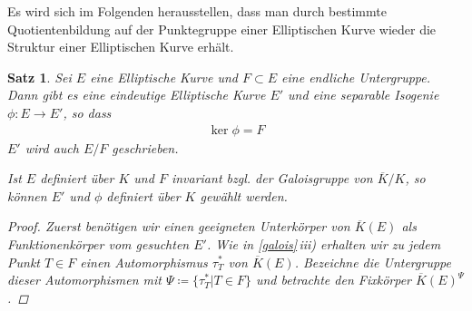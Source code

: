 \documentclass[english, german, parskip=half]{scrartcl}
\newtheorem{Satz}{Satz}[section]
\theoremstyle{definition}
\theoremstyle{remark}
\newcommand*{\K}{\ensuremath{K}} %
\newcommand*{\algK}{\ensuremath{\overline K}} %
\begin{document}
Es wird sich im Folgenden herausstellen, dass man durch bestimmte
Quotientenbildung auf der Punktegruppe einer Elliptischen Kurve wieder
die Struktur einer Elliptischen Kurve erhält.

\begin{Satz}
  Sei $E$ eine Elliptische Kurve und $F\subset E$ eine endliche
  Untergruppe.
  Dann gibt es eine eindeutige Elliptische Kurve $E'$ und eine
  separable Isogenie $\phi\colon E\to E'$, so dass
  \begin{gather*}
    \ker\phi = F
  \end{gather*}
  $E'$ wird auch $E/F$ geschrieben.

  Ist $E$ definiert über $K$ und $F$ invariant bzgl. der Galoisgruppe
  von $\algK/\K$, so können $E'$ und $\phi$ definiert über $K$ gewählt
  werden.
  \begin{proof}
    Zuerst benötigen wir einen geeigneten Unterkörper von $\algK(E)$
    als Funktionenkörper vom gesuchten $E'$.
    Wie in \autoref{galois}\,\emph{iii)} erhalten wir zu jedem Punkt
    $T\in F$ einen Automorphismus $\tau_T^*$ von $\algK(E)$.
    Bezeichne die Untergruppe dieser Automorphismen mit 
    $\Psi\coloneqq\{\tau_T^* | T\in F\}$ und
    betrachte den Fixkörper $\algK(E)^\Psi$.    
  \end{proof}

\end{Satz}


\printbibliography
\end{document}
